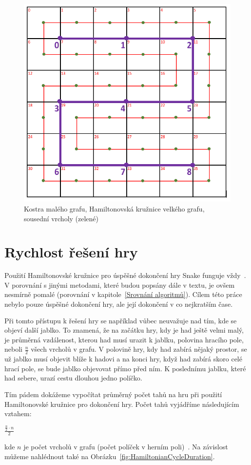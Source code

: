 \begin{figure}[H]
    \centering
    \includegraphics[width=0.7\linewidth]{Images/HledaniKruzniceZKostry.png}
    \caption{Kostra malého grafu, Hamiltonovská kružnice velkého grafu, sousední vrcholy (zelené)}
    \label{fig:HledaniKruzniceZKostry}
\end{figure}

\section{Rychlost řešení hry}

Použití Hamiltonovské kružnice pro úspěšné dokončení hry Snake funguje vždy~\cite{Graafsma2025Snake}. V porovnání s jinými metodami, které budou popsány dále v textu, je ovšem nesmírně pomalé (porovnání v kapitole~\ref{Srovnání algoritmů}). Cílem této práce nebylo pouze úspěšné dokončení hry, ale její dokončení v co nejkratším čase.

Při tomto přístupu k řešení hry se například vůbec neuvažuje nad tím, kde se objeví další jablko. To znamená, že na začátku hry, kdy je had ještě velmi malý, je průměrná vzdálenost, kterou had musí urazit k jablku, polovina hracího pole, neboli  \(\frac{n}{2}\) všech vrcholů v grafu. V polovině hry, kdy had zabírá nějaký prostor, se už jablko musí objevit blíže k hadovi a na konci hry, když had zabírá skoro celé hrací pole, se bude jablko objevovat přímo před ním. K poslednímu jablku, které had sebere, urazí cestu dlouhou jedno políčko.

Tím pádem dokážeme vypočítat průměrný počet tahů na hru při použití Hamiltonovské kružnice pro dokončení hry. Počet tahů vyjádříme následujícím vztahem: 
\begin{center}
    $\frac{\frac{n}{2} \cdot n}{2}$
\end{center}
kde \(n\) je počet vrcholů v grafu (počet políček v herním poli)~\cite{alphaphoenix2020snake}.  Na závislost můžeme nahlédnout také na Obrázku~\ref{fig:HamiltonianCycleDuration}.

